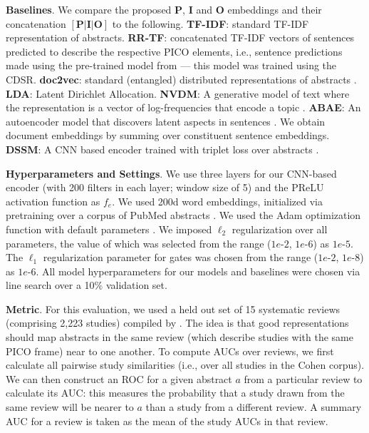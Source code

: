 \documentclass[11pt,a4paper]{article}
\begin{document}
\noindent \textbf{Baselines}. We compare the proposed {\bf P}, {\bf I} and {\bf O} embeddings and their concatenation $\mathbf{[P|I|O]}$ to the following. {\bf TF-IDF}: standard TF-IDF representation of abstracts. {\bf RR-TF}: concatenated TF-IDF vectors of sentences predicted to describe the respective PICO elements, i.e., sentence predictions made using the pre-trained model from \cite{wallace2016extracting} --- this model was trained using the CDSR. {\bf doc2vec}: standard (entangled) distributed representations of abstracts \cite{le2014distributed}. {\bf LDA}: Latent Dirichlet Allocation. {\bf NVDM}: A generative model of text where the representation is a vector of log-frequencies that encode a topic \cite{miao2016neural}. {\bf ABAE}: An autoencoder model that discovers latent aspects in sentences \cite{he-2017}. We obtain document embeddings by summing over constituent sentence embeddings. {\bf DSSM}: A CNN based encoder trained with triplet loss over abstracts \cite{shen2014latent}.

\vspace{.15em}
\noindent \textbf{Hyperparameters and Settings}. We use three layers for our CNN-based encoder (with 200 filters in each layer; window size of 5) and the PReLU \cite{he2015delving} activation function as $f_e$. We used 200d word embeddings, initialized via pretraining over a corpus of PubMed abstracts \cite{moen2013distributional}. We used the Adam optimization function with default parameters \cite{kingma2014adam}. We imposed $\ell_2$ regularization over all parameters, the value of which was selected from the range ($1e$-$2$, $1e$-$6$) as $1e$-$5$. The $\ell_1$ regularization parameter for gates was chosen from the range ($1e$-$2$, $1e$-$8$) as $1e$-$6$. All model hyperparameters for our models and baselines were chosen via line search over a 10\% validation set.

\vspace{.15em}
\noindent \textbf{Metric}. For this evaluation, we used a held out set of 15 systematic reviews (comprising 2,223 studies) compiled by . The idea is that good representations should map abstracts in the same review (which describe studies with the same PICO frame) near to one another. To compute AUCs over reviews, we first calculate all pairwise study similarities (i.e., over all studies in the Cohen corpus). We can then construct an ROC for a given abstract $a$ from a particular review to calculate its AUC: this measures the probability that a study drawn from the same review will be nearer to $a$ than a study from a different review. A summary AUC for a review is taken as the mean of the study AUCs in that review.
\end{document}
